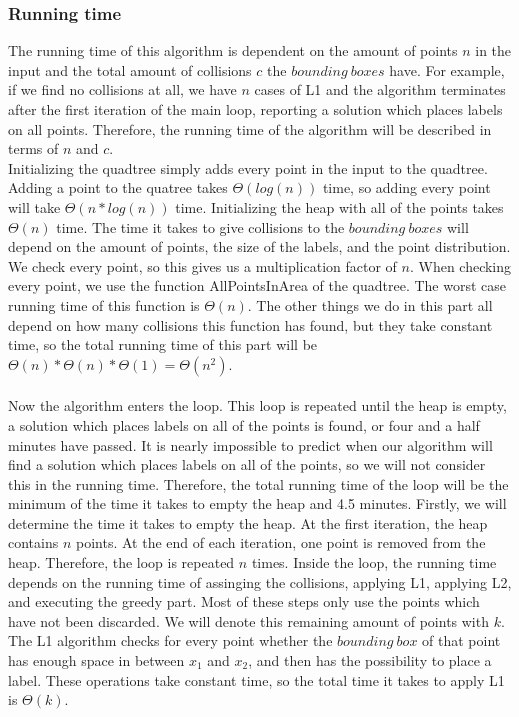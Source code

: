 \documentclass[crop=false,a4paper,oneside,11pt]{article}
\begin{document}
\subsubsection{Running time}
The running time of this algorithm is dependent on the amount of points $n$ in the input and the total amount of collisions $c$ the $bounding \ boxes$ have. For example, if we find no collisions at all, we have $n$ cases of L1 and the algorithm terminates after the first iteration of the main loop, reporting a solution which places labels on all points. Therefore, the running time of the algorithm will be described in terms of $n$ and $c$. \\
Initializing the quadtree simply adds every point in the input to the quadtree. Adding a point to the quatree takes $\Theta(log(n))$ time, so adding every point will take $\Theta(n*log(n))$ time. Initializing the heap with all of the points takes $\Theta(n)$ time. The time it takes to give collisions to the $bounding \ boxes$ will depend on the amount of points, the size of the labels, and the point distribution. We check  every point, so this gives us a multiplication factor of $n$. When checking every point, we use the function AllPointsInArea of the quadtree. The worst case running time of this function is $\Theta(n)$. The other things we do in this part all depend on how many collisions this function has found, but they take constant time, so the total running time of this part will be $\Theta(n)*\Theta(n)*\Theta(1) = \Theta(n^2)$.
  \\ \\
Now the algorithm enters the loop. This loop is repeated until the heap is empty, a solution which places labels on all of the points is found, or four and a half minutes have passed. It is nearly impossible to predict when our algorithm will find a solution which places labels on all of the points, so we will not consider this in the running time. Therefore, the total running time of the loop will be the minimum of the time it takes to empty the heap and 4.5 minutes. Firstly, we will determine the time it takes to empty the heap. At the first iteration, the heap contains $n$ points. At the end of each iteration, one point is removed from the heap. Therefore, the loop is repeated $n$ times. Inside the loop, the running time depends on the running time of assinging the collisions, applying L1, applying L2, and executing the greedy part. Most of these steps only use the points which have not been discarded. We will denote this remaining amount of points with $k$. \\ The L1 algorithm checks for every point whether the $bounding \ box$ of that point has enough space in between $x_1$ and $x_2$, and then has the possibility to place a label. These operations take constant time, so the total time it takes to apply L1 is $\Theta(k)$. \\
\end{document}
